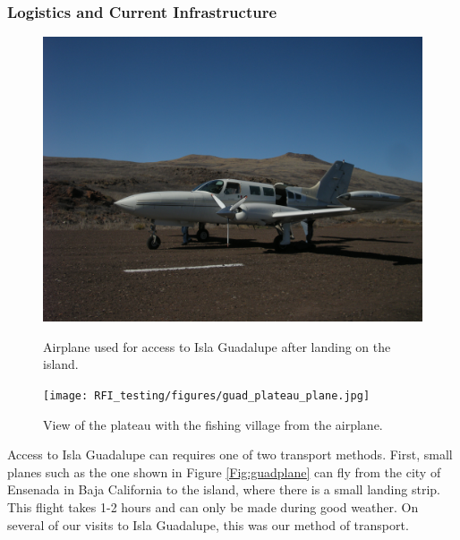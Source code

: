 \subsubsection{Logistics and Current Infrastructure}

\begin{figure}[htb]
\centering
\begin{minipage}[b]{0.47\textwidth}
\centering
\includegraphics[width=0.95\linewidth]{RFI_testing/figures/guad_plane.jpg}
\caption{Airplane used for access to Isla Guadalupe after landing on the island.}
\label{Fig:guadplane}
\end{minipage}%
\begin{minipage}[b]{0.02\textwidth}
\hspace{1cm}
\end{minipage}%
\begin{minipage}[b]{0.47\textwidth}
\centering
\texttt{[image: RFI\_testing/figures/guad\_plateau\_plane.jpg]}
\caption{View of the plateau with the fishing village from the airplane.}
\label{Fig:guadplateau}
\end{minipage}
\end{figure}

Access to Isla Guadalupe can requires one of two transport methods. First, small planes such as the one shown in Figure \ref{Fig:guadplane} can fly from the city of Ensenada in Baja California to the island, where there is a small landing strip. This flight takes 1-2 hours and can only be made during good weather. On several of our visits to Isla Guadalupe, this was our method of transport. 

